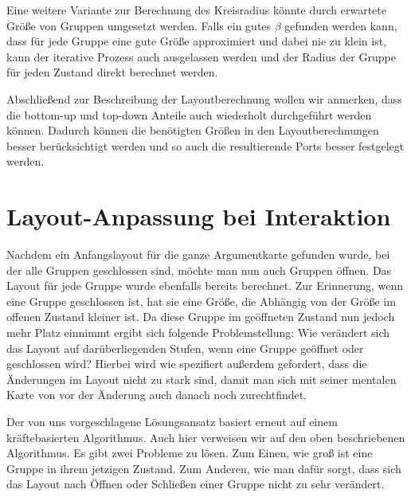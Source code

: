 Eine weitere Variante zur Berechnung des Kreisradius könnte durch erwartete Größe von Gruppen umgesetzt werden. 
Falls ein gutes $\beta$ gefunden werden kann, dass für jede Gruppe eine gute Größe approximiert und dabei nie zu klein ist, kann der iterative Prozess auch ausgelassen werden
und der Radius der Gruppe für jeden Zustand direkt berechnet werden.			


Abschließend zur Beschreibung der Layoutberechnung wollen wir anmerken, dass die bottom-up und top-down Anteile auch wiederholt durchgeführt werden können.
Dadurch können die benötigten Größen in den Layoutberechnungen besser berücksichtigt werden und so auch die resultierende Ports besser festgelegt werden.

\section{Layout-Anpassung bei Interaktion}%
\label{sec:Interaktion}
Nachdem ein Anfangslayout für die ganze Argumentkarte gefunden wurde, bei der alle Gruppen geschlossen sind, möchte man nun auch Gruppen öffnen. 
Das Layout für jede Gruppe wurde ebenfalls bereits berechnet. Zur Erinnerung, wenn eine Gruppe geschlossen ist, hat sie eine Größe, 
die Abhängig von der Größe im offenen Zustand kleiner ist. 
Da diese Gruppe im geöffneten Zustand nun jedoch mehr Platz einnimmt ergibt sich folgende Problemstellung:
Wie verändert sich das Layout auf darüberliegenden Stufen, wenn eine Gruppe geöffnet oder geschlossen wird? 
Hierbei wird wie spezifiert außerdem gefordert, dass die Änderungen im Layout nicht zu stark sind, 
damit man sich mit seiner mentalen Karte von vor der Änderung auch danach noch zurechtfindet.

Der von uns vorgeschlagene Lösungsansatz basiert erneut auf einem kräftebasierten Algorithmus. 
Auch hier verweisen wir auf den oben beschriebenen Algorithmus. Es gibt zwei Probleme zu lösen. 
Zum Einen, wie groß ist eine Gruppe in ihrem jetzigen Zustand.  
Zum Anderen, wie man dafür sorgt, dass sich das Layout nach Öffnen oder Schließen einer Gruppe nicht zu sehr verändert.

